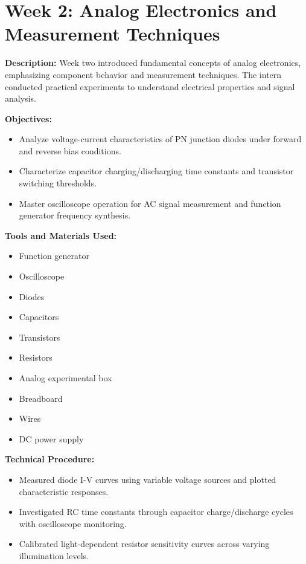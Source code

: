 \documentclass[12pt,a4paper]{report}
\begin{document}
\section{Week 2: Analog Electronics and Measurement Techniques}

\textbf{Description:} Week two introduced fundamental concepts of analog electronics, emphasizing component behavior and measurement techniques. The intern conducted practical experiments to understand electrical properties and signal analysis.

\textbf{Objectives:}
\begin{itemize}
    \item Analyze voltage-current characteristics of PN junction diodes under forward and reverse bias conditions.
    \item Characterize capacitor charging/discharging time constants and transistor switching thresholds.
    \item Master oscilloscope operation for AC signal measurement and function generator frequency synthesis.
\end{itemize}

\textbf{Tools and Materials Used:}
\begin{multicols}{2}
\begin{itemize}
    \item Function generator
    \item Oscilloscope
    \item Diodes
    \item Capacitors
    \item Transistors
    \item Resistors
    \item Analog experimental box
    \item Breadboard
    \item Wires
    \item DC power supply
\end{itemize}
\end{multicols}

\textbf{Technical Procedure:}
\noindent
\begin{itemize}
    \item Measured diode I-V curves using variable voltage sources and plotted characteristic responses.
    \item Investigated RC time constants through capacitor charge/discharge cycles with oscilloscope monitoring.
    \item Calibrated light-dependent resistor sensitivity curves across varying illumination levels.
\end{itemize}
\end{document}
